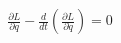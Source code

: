 \documentclass[preview]{standalone}
\begin{document}
\begin{align*}
\frac{\partial L}{\partial q} - \frac{d}{dt} \left( \frac{\partial L}{\partial \dot{q}} \right) = 0
\end{align*}
\end{document}
